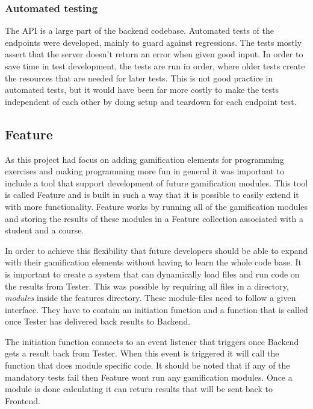 \subsubsection{Automated testing}
The API is a large part of the backend codebase. Automated tests of the endpoints were developed, mainly to guard against regressions. The tests mostly assert that the server doesn't return an error when given good input. In order to save time in test development, the tests are run in order, where older tests create the resources that are needed for later tests. This is not good practice in automated tests, but it would have been far more costly to make the tests independent of each other by doing setup and teardown for each endpoint test.

\subsection{Feature}

As this project had focus on adding gamification elements for programming exercises
and making programming more fun in general it was important to include
a tool that support development of future gamification modules. This tool is called
Feature and is built in such a way that it is possible to easily extend it with more
functionality. Feature works by running all of the gamification modules and
storing the results of these modules in a Feature collection associated with
a student and a course.

In order to achieve this flexibility that future developers should be able to expand
with their gamification elements without having to learn the whole code base.
It is important to create a system that can dynamically load files and run
code on the results from Tester. This was possible by requiring all
files in a directory, \textit{modules} inside the features directory. These module-files need to follow
a given interface. They have to contain an initiation function and a function
that is called once Tester has delivered back results to Backend. 

The initiation function connects to an event listener that triggers once Backend
gets a result back from Tester. When this event is triggered it will call the
function that does module specific code. It should be noted that if any of the
mandatory tests fail then Feature wont run any gamification modules. Once a module
is done calculating it can return results that will be sent back to Frontend.

